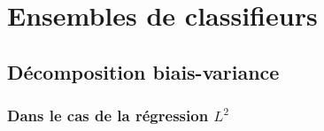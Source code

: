 
\chapter{Ensembles de classifieurs}
\label{chap:trois}


\section{Décomposition biais-variance}\label{sec:biais.var}
\subsection{Dans le cas de la régression $L^2$}

